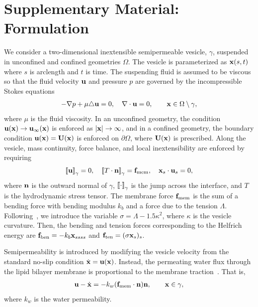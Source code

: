 \documentclass[9pt,twocolumn,twoside,lineno]{pnas-new}
\begin{document}
% 
 


\section*{Supplementary Material: Formulation}
We consider a two-dimensional inextensible semipermeable vesicle,
$\gamma$, suspended in unconfined and confined geometries $\Omega$. The
vesicle is parameterized as $\mathbf{x}(s,t)$ where $s$ is arclength and $t$ is
time. The suspending fluid is assumed to be viscous so that the fluid
velocity $\mathbf{u}$ and pressure $p$ are governed by the incompressible
Stokes equations
\begin{align}
  \label{eqn:governing}
  -\nabla p + \mu \triangle \mathbf{u} = 0, \quad
  \nabla \cdot \mathbf{u} = 0, \qquad \mathbf{x} \in \Omega \setminus \gamma,
\end{align}
where $\mu$ is the fluid viscosity. In an unconfined geometry, the
condition $\mathbf{u}(\mathbf{x}) \rightarrow \mathbf{u}_\infty(\mathbf{x})$ is enforced as $|\mathbf{x}|
\rightarrow \infty$, and in a confined geometry, the boundary condition
$\mathbf{u}(\mathbf{x}) = \mathbf{U}(\mathbf{x})$ is enforced on $\partial \Omega$, where $\mathbf{U}(\mathbf{x})$
is prescribed. Along the vesicle, mass continuity, force balance, and
local inextensibility are enforced by requiring
\begin{align}
  \label{eqn:jump}
  \left[\!\left[ \mathbf{u} \right]\!\right]_\gamma = 0, \quad
  \left[\!\left[ T\cdot\mathbf{n} \right]\!\right]_\gamma = \mathbf{f}_\mathrm{mem}, \quad
  \mathbf{x}_s \cdot \mathbf{u}_s = 0,
\end{align}
where $\mathbf{n}$ is the outward normal of $\gamma$, $\left[\!\left[ \cdot \right]\!\right]_\gamma$ is the
jump across the interface, and $T$ is the hydrodynamic stress tensor.
The membrane force $\mathbf{f}_\mathrm{mem}$ is the sum of a bending force
with bending modulus $k_b$ and a force due to the tension $\Lambda$.
Following~\cite{vee-gue-zor-bir2009}, we introduce the variable $\sigma
= \Lambda - 1.5\kappa^2$, where $\kappa$ is the vesicle curvature. Then,
the bending and tension forces corresponding to the Helfrich energy are
$\mathbf{f}_\mathrm{ben} = -k_b \mathbf{x}_{ssss}$ and $\mathbf{f}_\mathrm{ten} = (\sigma
\mathbf{x}_s)_s$. 

Semipermeability is introduced by modifying the vesicle velocity from
the standard no-slip condition $\dot{\mathbf{x}} = \mathbf{u}(\mathbf{x})$. Instead,
the permeating water flux through the lipid bilayer membrane is proportional to the
membrane traction~\cite{yao-mor2017}. That is, 
\begin{align}
  \label{eqn:vesicleFlux}
  \mathbf{u} - \dot{\mathbf{x}} = - k_w (\mathbf{f}_\mathrm{mem} \cdot \mathbf{n}) \mathbf{n}, \qquad
  \mathbf{x} \in \gamma,
\end{align}
where $k_w$ is the water permeability.
\end{document}
